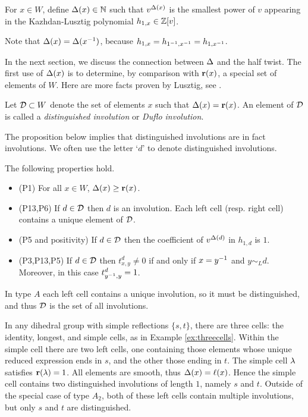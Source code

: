 \begin{defn}\label{def:D} For $x \in W$, define $\Delta(x) \in {\mathbb{N}}$ such that $v^{\Delta(x)}$ is the smallest power of $v$ appearing in the Kazhdan-Lusztig polynomial $h_{1,x} \in {\mathbb{Z}}[v]$.
\end{defn}	

Note that $\Delta(x) = \Delta(x^{-1})$, because $h_{1,x} = h_{1^{-1},x^{-1}} = h_{1,x^{-1}}$.

In the next section, we discuss the connection between $\Delta$ and the half twist. The first use of $\Delta(x)$ is to determine, by comparison with $\mathbf{r}(x)$, a special set of elements of $W$. Here are more facts proven by Lusztig, see \cite[Section 14]{LuszUnequal14}.

\begin{defn}\label{def:duflo}
Let ${\mathcal{D}}\subset W$ denote the set of elements $x$ such that $\Delta(x)={\mathbf r}(x)$.  An element of ${\mathcal{D}}$ is called a \emph{distinguished involution} or \emph{Duflo involution}.
\end{defn}

The proposition below implies that distinguished involutions are in fact involutions.  We often use the letter `$d$' to denote distinguished involutions.

\begin{prop}\label{prop:moreP} The following properties hold. \begin{itemize}
\item (P1) For all $x \in W$, $\Delta(x) \ge \mathbf{r}(x)$.
\item (P13,P6) If $d\in {\mathcal{D}}$ then $d$ is an involution.  Each left cell (resp. right cell) contains a unique element of ${\mathcal{D}}$. %
\item (P5 and positivity) If $d \in {\mathcal{D}}$ then the coefficient of $v^{\Delta(d)}$ in $h_{1,d}$ is $1$.
\item (P3,P13,P5) If $d \in {\mathcal{D}}$ then $t^d_{x,y} \ne 0$ if and only if $x = y^{-1}$ and $y \sim_L d$. Moreover, in this case $t^d_{y^{-1},y} = 1$.
\end{itemize}
\end{prop}

In type $A$ each left cell contains a unique involution, so it must be distinguished, and thus ${\mathcal{D}}$ is the set of all involutions.

\begin{ex} In any dihedral group with simple reflections $\{s,t\}$, there are three cells: the identity, longest, and simple cells, as in Example \ref{ex:threecells}. Within the simple
cell there are two left cells, one containing those elements whose unique reduced expression ends in $s$, and the other those ending in $t$. The simple cell $\lambda$ satisfies $\mathbf{r}(\lambda)=1$.
All elements are smooth, thus $\Delta(x) = \ell(x)$. Hence the simple cell contains two distinguished involutions of length $1$, namely $s$ and $t$. Outside of the special case of type
$A_2$, both of these left cells contain multiple involutions, but only $s$ and $t$ are distinguished. \end{ex}

